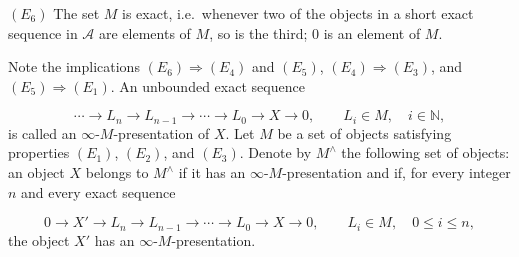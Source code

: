 \noindent$(E_6)$ The set $M$ is exact, i.e.\ whenever two of the objects in
a short exact sequence in $\mathcal A$ are elements of $M$, so is the
third; $0$ is an element of $M$.

Note the implications $(E_6)\Rightarrow(E_4)$ and $(E_5)$,
$(E_4)\Rightarrow(E_3)$, and $(E_5)\Rightarrow(E_1)$. An unbounded exact
sequence

\[
\cdots\longrightarrow L_n\longrightarrow L_{n-1}
\longrightarrow\cdots\longrightarrow L_0\longrightarrow X
\longrightarrow0,
\qquad L_i\in M,\quad i\in\mathbb N,
\]
is called an $\infty$-$M$-presentation of $X$. Let $M$ be a set of objects
satisfying properties $(E_1)$, $(E_2)$, and $(E_3)$. Denote by
$M^{\wedge}$ the following set of objects: an object $X$ belongs to
$M^{\wedge}$ if it has an $\infty$-$M$-presentation and if, for every
integer $n$ and every exact sequence

\[
0\longrightarrow X'\longrightarrow L_n\longrightarrow L_{n-1}
\longrightarrow\cdots\longrightarrow L_0\longrightarrow X
\longrightarrow0,
\qquad L_i\in M,\quad0\leq i\leq n,
\]
the object $X'$ has an $\infty$-$M$-presentation.
\endgroup
